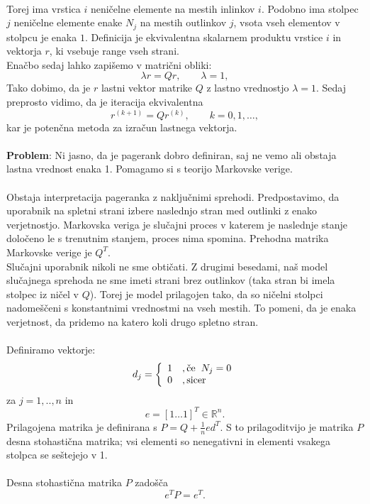 \documentclass[a4paper]{article}
\begin{document}
\\
Torej ima vrstica $i$ neničelne elemente na mestih inlinkov $i$. Podobno ima stolpec $j$ neničelne elemente enake $N_j$ na mestih  outlinkov $j$, vsota vseh elementov v stolpcu je enaka $1$. Definicija je ekvivalentna skalarnem produktu vrstice $i$ in vektorja $r$, ki vsebuje range vseh strani.\\
Enačbo sedaj lahko zapišemo v matrični obliki:
$$ \lambda r = Qr,     \qquad \lambda = 1,$$
Tako dobimo, da je $r$ lastni vektor matrike $Q$ z lastno vrednostjo $\lambda = 1$. Sedaj preprosto vidimo, da je iteracija ekvivalentna
$$r^{(k+1)} = Qr^{(k)},\qquad  k=0,1,… ,$$
kar je potenčna metoda za izračun lastnega vektorja.\\
\\ \textbf{Problem}: Ni jasno, da je pagerank dobro definiran, saj ne vemo ali obstaja lastna vrednost enaka 1. Pomagamo si s teorijo Markovske verige.\\
\\Obstaja interpretacija pageranka z naključnimi sprehodi. Predpostavimo, da uporabnik na spletni strani izbere naslednjo stran  med outlinki z enako verjetnostjo. Markovska veriga je slučajni proces v katerem je naslednje stanje določeno le s trenutnim stanjem, proces nima spomina. Prehodna matrika Markovske verige je $Q^T$.\\
Slučajni uporabnik nikoli ne sme obtičati. Z drugimi besedami, naš model slučajnega sprehoda ne sme imeti strani brez outlinkov (taka stran bi imela stolpec iz ničel v $Q$). Torej je model prilagojen tako, da so ničelni stolpci nadomeščeni s konstantnimi vrednostmi na vseh mestih. To pomeni, da je enaka verjetnost, da pridemo na katero koli drugo spletno stran. \\ 
\\Definiramo vektorje: \\
\[
d_j = 
\left \{
	\begin{array}{ll}
		1  &, \mbox{če}\hspace{2mm} N_j = 0 \\
		0 &, \mbox{sicer} 
	\end{array}
\right. \]
za $j = 1, .., n$ in
$$e = [1 … 1] ^T \in \mathbb{R}^n.$$
Prilagojena matrika je definirana s $ P = Q + \frac{1}{n}ed^T$. 
S to prilagoditvijo je matrika $P$ desna stohastična matrika; vsi elementi so nenegativni in elementi vsakega stolpca se seštejejo v 1. \\
\\Desna stohastična matrika $P$ zadošča 
$$e^TP = e^T.$$ \\
\end{document}
